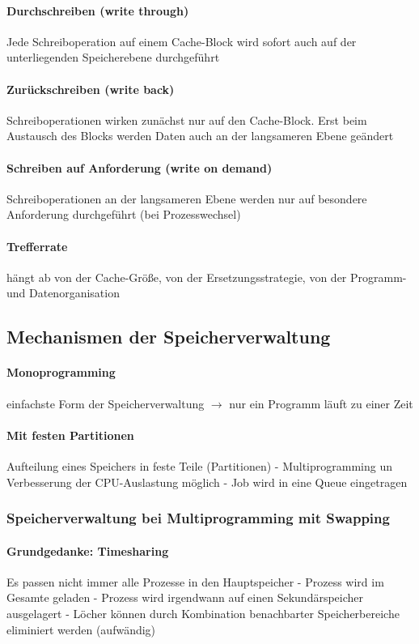\documentclass[11pt,a4paper,landscape]{article}
\begin{document}
\begin{multicols*}{3}
	\paragraph{Durchschreiben (write through)} Jede Schreiboperation auf einem Cache-Block wird sofort auch auf der unterliegenden Speicherebene durchgeführt
	\paragraph{Zurückschreiben (write back)} Schreiboperationen wirken zunächst nur auf den Cache-Block. Erst beim Austausch des Blocks werden Daten auch an der langsameren Ebene geändert
	\paragraph{Schreiben auf Anforderung (write on demand)} Schreiboperationen an der langsameren Ebene werden nur auf besondere Anforderung durchgeführt (bei Prozesswechsel)
	\paragraph{Trefferrate} hängt ab von der Cache-Größe, von der Ersetzungsstrategie, von der Programm- und Datenorganisation
	\subsection{Mechanismen der Speicherverwaltung}
	\paragraph{Monoprogramming} einfachste Form der Speicherverwaltung $\rightarrow$ nur ein Programm läuft zu einer Zeit
	\paragraph{Mit festen Partitionen} Aufteilung eines Speichers in feste Teile (Partitionen) - Multiprogramming un Verbesserung der CPU-Auslastung möglich - Job wird in eine Queue eingetragen
	\subsubsection{Speicherverwaltung bei Multiprogramming mit Swapping}
	\paragraph{Grundgedanke: Timesharing} Es passen nicht immer alle Prozesse in den Hauptspeicher - Prozess wird im Gesamte geladen - Prozess wird irgendwann auf einen Sekundärspeicher ausgelagert - Löcher können durch Kombination benachbarter Speicherbereiche eliminiert werden (aufwändig)

\end{multicols*}
\end{document}
